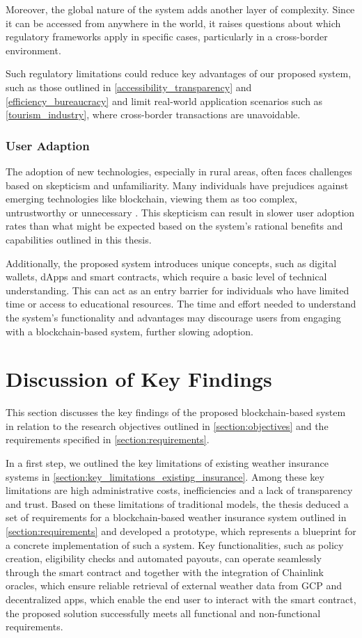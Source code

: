 Moreover, the global nature of the system adds another layer of complexity. Since it can be accessed from anywhere in the world, it raises questions about which regulatory frameworks apply in specific cases, particularly in a cross-border environment.

Such regulatory limitations could reduce key advantages of our proposed system, such as those outlined in \cref{accessibility_transparency} and \cref{efficiency_bureaucracy} and limit real-world application scenarios such as \cref{tourism_industry}, where cross-border transactions are unavoidable.

\subsubsection{User Adaption}
The adoption of new technologies, especially in rural areas, often faces challenges based on skepticism and unfamiliarity. Many individuals have prejudices against emerging technologies like blockchain, viewing them as too complex, untrustworthy or unnecessary \autocite{Alabdali2023Influential}. This skepticism can result in slower user adoption rates than what might be expected based on the system's rational benefits and capabilities outlined in this thesis.

Additionally, the proposed system introduces unique concepts, such as digital wallets, dApps and smart contracts, which require a basic level of technical understanding. This can act as an entry barrier for individuals who have limited time or access to educational resources. The time and effort needed to understand the system's functionality and advantages may discourage users from engaging with a blockchain-based system, further slowing adoption.

\section{Discussion of Key Findings}
This section discusses the key findings of the proposed blockchain-based system in relation to the research objectives outlined in \cref{section:objectives} and the requirements specified in \cref{section:requirements}.

In a first step, we outlined the key limitations of existing weather insurance systems in \cref{section:key_limitations_existing_insurance}. Among these key limitations are high administrative costs, inefficiencies and a lack of transparency and trust. Based on these limitations of traditional models, the thesis deduced a set of requirements for a blockchain-based weather insurance system outlined in \cref{section:requirements} and developed a prototype, which represents a blueprint for a concrete implementation of such a system. Key functionalities, such as policy creation, eligibility checks and automated payouts, can operate seamlessly through the smart contract and together with the integration of Chainlink oracles, which ensure reliable retrieval of external weather data from GCP and decentralized apps, which enable the end user to interact with the smart contract, the proposed solution successfully meets all functional and non-functional requirements.

